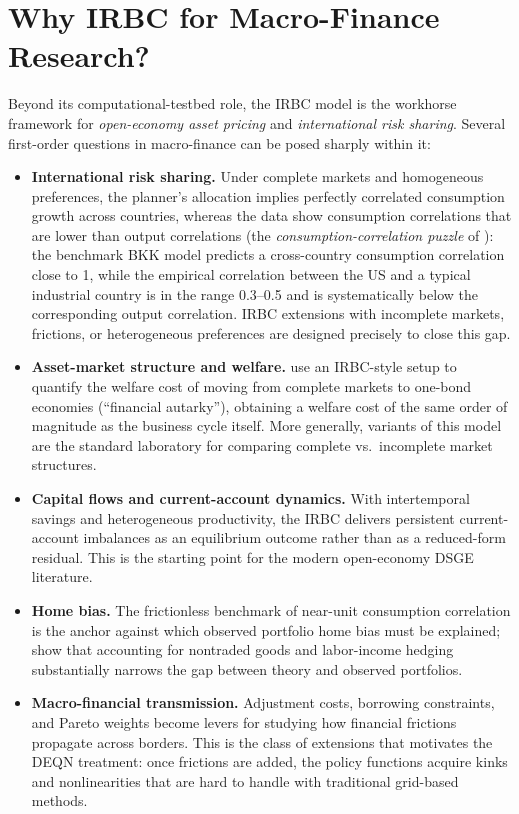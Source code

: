 \documentclass[11pt,a4paper]{report}
\begin{document}
\section{Why IRBC for Macro-Finance Research?}
\label{sec:irbc_motivation}

Beyond its computational-testbed role, the IRBC model is the workhorse framework for \emph{open-economy asset pricing} and \emph{international risk sharing}.  Several first-order questions in macro-finance can be posed sharply within it:

\begin{itemize}[itemsep=2pt]
\item \textbf{International risk sharing.}  Under complete markets and homogeneous preferences, the planner's allocation implies perfectly correlated consumption growth across countries, whereas the data show consumption correlations that are lower than output correlations (the \emph{consumption-correlation puzzle} of \citealt{backus1992international}): the benchmark BKK model predicts a cross-country consumption correlation close to 1, while the empirical correlation between the US and a typical industrial country is in the range 0.3--0.5 and is systematically below the corresponding output correlation.  IRBC extensions with incomplete markets, frictions, or heterogeneous preferences are designed precisely to close this gap.
\item \textbf{Asset-market structure and welfare.}  \citet{heathcote2002financial} use an IRBC-style setup to quantify the welfare cost of moving from complete markets to one-bond economies (``financial autarky''), obtaining a welfare cost of the same order of magnitude as the business cycle itself.  More generally, variants of this model are the standard laboratory for comparing complete vs.\ incomplete market structures.
\item \textbf{Capital flows and current-account dynamics.}  With intertemporal savings and heterogeneous productivity, the IRBC delivers persistent current-account imbalances as an equilibrium outcome rather than as a reduced-form residual.  This is the starting point for the modern open-economy DSGE literature.
\item \textbf{Home bias.}  The frictionless benchmark of near-unit consumption correlation is the anchor against which observed portfolio home bias must be explained; \citet{heathcote2013international} show that accounting for nontraded goods and labor-income hedging substantially narrows the gap between theory and observed portfolios.
\item \textbf{Macro-financial transmission.}  Adjustment costs, borrowing constraints, and Pareto weights become levers for studying how financial frictions propagate across borders.  This is the class of extensions that motivates the DEQN treatment: once frictions are added, the policy functions acquire kinks and nonlinearities that are hard to handle with traditional grid-based methods.
\end{itemize}
\end{document}
